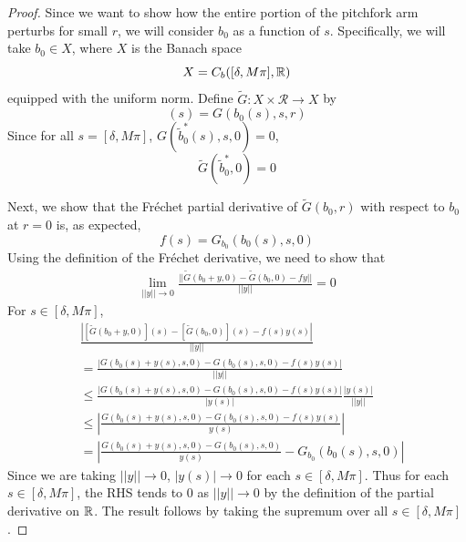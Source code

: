 \documentclass[thesis.tex]{subfiles}
\begin{document}
\begin{lemma}
\begin{proof}
Since we want to show how the entire portion of the pitchfork arm perturbs for small $r$, we will consider $b_0$ as a function of $s$. Specifically, we will take $b_0 \in X$, where $X$ is the Banach space
\[
X = C_b([\delta, M \pi], \mathbb{R})
\]
equipped with the uniform norm. Define $\tilde{G}: X \times \mathcal{R} \rightarrow X$ by 
\begin{equation}
[\tilde{G}(b_0, r)](s) = G(b_0(s), s, r) 
\end{equation}
Since for all $s = [\delta, M \pi]$, $G(\tilde{b}_0^*(s), s, 0) = 0$, 
\[
\tilde{G}(\tilde{b}_0^*, 0) = 0
\]

Next, we show that the Fr\'echet partial derivative of $\tilde{G}(b_0,r)$ with respect to $b_0$ at $r = 0$ is, as expected, 
\begin{equation}
f(s) = G_{b_0}(b_0(s), s, 0) 
\end{equation}
Using the definition of the Fr\'echet derivative, we need to show that
\begin{align}
\lim_{||y|| \rightarrow 0} \frac{|| \tilde{G}(b_0 + y, 0) - \tilde{G}(b_0, 0) - fy||}{||y||} = 0
\end{align}
For $s \in [\delta, M \pi]$,
\begin{align*}
&\frac{ \left| [\tilde{G}(b_0 + y, 0)](s) - [\tilde{G}(b_0, 0)](s) - f(s) y(s) \right| }{||y||} \\
&=\frac{ \left| G(b_0(s) + y(s), s, 0) - G(b_0(s), s, 0) - f(s) y(s) \right| }{||y||} \\
&\leq \frac{\left| G(b_0(s) + y(s), s, 0) - G(b_0(s), s, 0) - f(s) y(s)\right|}{|y(s)|} \frac{|y(s)|}{||y||} \\
&\leq \left| \frac{ G(b_0(s) + y(s), s, 0) - G(b_0(s), s, 0) - f(s) y(s)}{y(s)} \right| \\
&= \left| \frac{ G(b_0(s) + y(s), s, 0) - G(b_0(s), s, 0)}{y(s)} - G_{b_0}(b_0(s), s, 0) \right|
\end{align*}
Since we are taking $||y|| \rightarrow 0$, $|y(s)| \rightarrow 0$ for each $s \in [\delta, M \pi]$. Thus for each $s \in [\delta, M \pi]$, the RHS tends to 0 as $||y|| \rightarrow 0$ by the definition of the partial derivative on $\mathbb{R}$. The result follows by taking the supremum over all $s \in [\delta, M \pi]$.


\end{proof}
\end{lemma}
\end{document}
